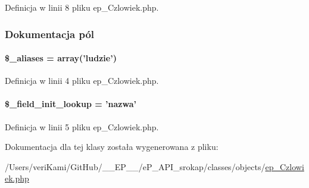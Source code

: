 Definicja w linii 8 pliku ep\-\_\-\-Czlowiek.\-php.



\subsubsection{Dokumentacja pól}
\hypertarget{classep___czlowiek_ab4e31d75f0bc5d512456911e5d01366b}{
\paragraph[{\$\-\_\-aliases}]{\setlength{\rightskip}{0pt plus 5cm}\$\-\_\-aliases = array('ludzie')}}\label{classep___czlowiek_ab4e31d75f0bc5d512456911e5d01366b}


Definicja w linii 4 pliku ep\-\_\-\-Czlowiek.\-php.

\hypertarget{classep___czlowiek_a4a4d54ae35428077a7c61ec8a5139af3}{
\paragraph[{\$\-\_\-field\-\_\-init\-\_\-lookup}]{\setlength{\rightskip}{0pt plus 5cm}\$\-\_\-field\-\_\-init\-\_\-lookup = 'nazwa'}}\label{classep___czlowiek_a4a4d54ae35428077a7c61ec8a5139af3}


Definicja w linii 5 pliku ep\-\_\-\-Czlowiek.\-php.



Dokumentacja dla tej klasy została wygenerowana z pliku\-:\begin{DoxyCompactItemize}
\item 
/\-Users/veri\-Kami/\-Git\-Hub/\-\_\-\-\_\-\-E\-P\-\_\-\-\_\-/e\-P\-\_\-\-A\-P\-I\-\_\-srokap/classes/objects/\hyperlink{ep___czlowiek_8php}{ep\-\_\-\-Czlowiek.\-php}\end{DoxyCompactItemize}
